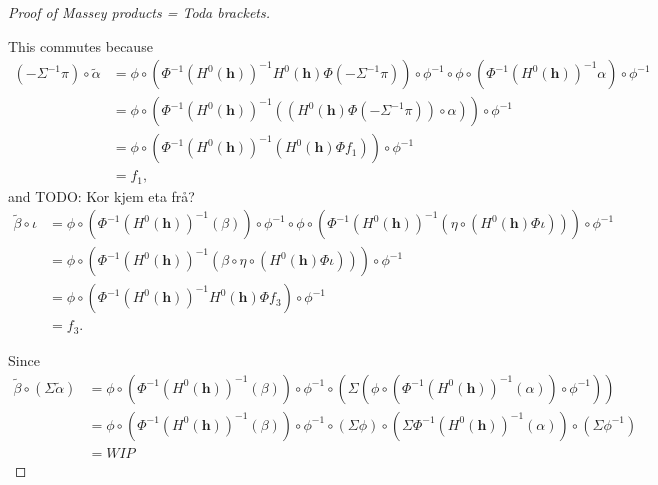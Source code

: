 \begin{proof}[Proof of Massey products = Toda brackets]
\begin{center}
    \end{center}
    This commutes because
    \begin{align*}
        (- \Sigma^{-1} \pi) \circ \tilde{\alpha} &= \phi \circ (\Phi^{-1} (H^0(\mathbf{h}))^{-1} H^0(\mathbf{h}) \Phi (- \Sigma^{-1} \pi)) \circ \phi^{-1} \circ \phi \circ (\Phi^{-1} (H^0(\mathbf{h}))^{-1} \alpha) \circ \phi^{-1}\\
        &= \phi \circ (
            \Phi^{-1} (H^0(\mathbf{h}))^{-1} (
                (H^0(\mathbf{h}) \Phi (- \Sigma^{-1} \pi)) \circ \alpha
                )
            ) \circ \phi^{-1} \\
        &= \phi \circ (\Phi^{-1} (H^0(\mathbf{h}))^{-1} (H^0(\mathbf{h}) \Phi f_1)) \circ \phi^{-1} \\
        &= f_1,
    \end{align*}
    and TODO: Kor kjem eta frå?
    \begin{align*}
        \tilde{\beta} \circ \iota &= \phi \circ (\Phi^{-1} (H^0(\mathbf{h}))^{-1} (\beta)) \circ \phi^{-1} \circ \phi \circ (\Phi^{-1} (H^0(\mathbf{h}))^{-1} (\eta \circ (H^0(\mathbf{h}) \Phi \iota))) \circ \phi^{-1} \\
        &= \phi \circ (\Phi^{-1} (H^0(\mathbf{h}))^{-1}(\beta \circ \eta \circ (H^0(\mathbf{h}) \Phi \iota))) \circ \phi^{-1} \\
        &= \phi \circ (\Phi^{-1} (H^0(\mathbf{h}))^{-1} H^0(\mathbf{h}) \Phi f_3) \circ \phi^{-1} \\
        &= f_3.
    \end{align*}

    Since
    \begin{align*}
        \tilde{\beta} \circ (\Sigma \tilde{\alpha}) &= \phi \circ (\Phi^{-1} (H^0(\mathbf{h}))^{-1} (\beta)) \circ \phi^{-1} \circ (\Sigma (\phi \circ (\Phi^{-1} (H^0(\mathbf{h}))^{-1} (\alpha)) \circ \phi^{-1})) \\
        &= \phi \circ (\Phi^{-1} (H^0(\mathbf{h}))^{-1} (\beta)) \circ \phi^{-1} \circ (\Sigma \phi) \circ (\Sigma \Phi^{-1} (H^0(\mathbf{h}))^{-1} (\alpha)) \circ (\Sigma \phi^{-1}) \\
        &= WIP
    \end{align*}
\end{proof}